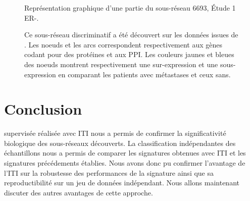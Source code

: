			\begin{figure}
				\begin{center}
					\def\svgwidth{\columnwidth}
					\caption{Représentation graphique d'une partie du sous-réseau 6693, Étude 1 ER-.}
					\label{fig:Subnetwork6693}
					\caption*{Ce sous-réseau discriminatif a été découvert sur les données issues de \citet{Sabatier2011}.
					Les noeuds et les arcs correspondent respectivement aux gènes codant pour des protéines et aux \acs{PPI}.
					Les couleurs jaunes et bleues des noeuds montrent respectivement une sur-expression et une sous-expression en comparant les patients avec métastases et ceux sans.}
				\end{center}
			\end{figure}


\pagebreak
	\section{\textcolor{green!45!black}{Conclusion}}

	 supervisée réalisée avec ITI nous a permis de confirmer la significativité biologique des sous-réseaux découverts.
		La classification indépendantes des échantillons nous a permis de comparer les signatures obtenues avec ITI et les signatures précédements établies.
		Nous avons donc pu confirmer l'avantage de l'ITI sur la robustesse des performances de la signature ainsi que sa reproductibilité sur un jeu de données indépendant.
		Nous allons maintenant discuter des autres avantages de cette approche.

